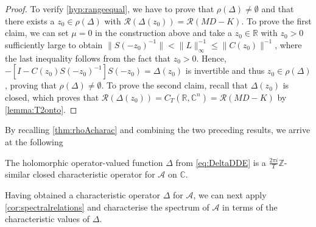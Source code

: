 \documentclass[english]{myarticle}
\begin{document}
\begin{sloppypar}
\begin{proof}
To verify \ref{hyp:rangeequal}, we have to prove that $\rho(\Delta) \neq \emptyset$ and that there exists a $z_0 \in \rho(\Delta)$ with $\mathcal{R}(\Delta(z_0)) = \mathcal{R}(MD-K)$. To prove the first claim, we can set $\mu = 0$ in the construction above and take a $z_0 \in \mathbb{R}$ with $z_0 > 0$ sufficiently large to obtain $\| S(-z_0)^{-1} \| <  \|L\|_\infty^{-1} \leq \|C(z_0)\|^{-1}$, where the last inequality follows from the fact that $z_0 > 0$. Hence, $-[I - C(z_0)S(-z_0)^{-1}]S(-z_0) = \Delta(z_0)$ is invertible and thus $z_0 \in \rho(\Delta)$, proving that $\rho(\Delta) \neq \emptyset$. To prove the second claim, recall that $\Delta(z_0)$ is closed, which proves that $\mathcal{R}(\Delta(z_0)) = C_T(\mathbb{R},\mathbb{C}^n) = \mathcal{R}(MD-K)$ by \cref{lemma:T2onto}.
\end{proof}

By recalling \cref{thm:rhoAcharac} and combining the two preceding results, we arrive at the following

\begin{corollary}
The holomorphic operator-valued function $\Delta$ from \eqref{eq:DeltaDDE} is a $\frac{2\pi i}{T}\mathbb{Z}$-similar closed characteristic operator for $\mathcal{A}$ on $\mathbb{C}$.
\end{corollary}

Having obtained a characteristic operator $\Delta$ for $\mathcal{A}$, we can next apply \cref{cor:spectralrelations} and characterise the spectrum of $\mathcal{A}$ in terms of the characteristic values of $\Delta$.


\end{sloppypar}
\end{document}
